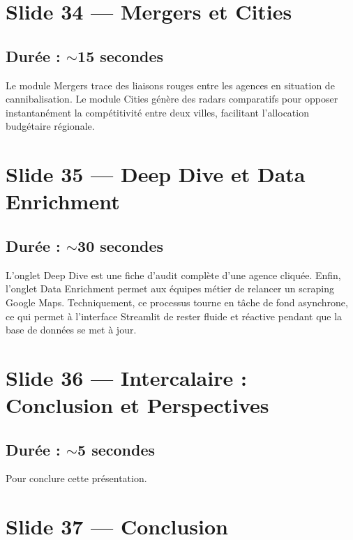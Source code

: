 \documentclass[11pt,a4paper]{article}
\begin{document}
\section{Slide 34 --- Mergers et Cities}
\subsection{Durée : $\sim$15 secondes}
Le module Mergers trace des liaisons rouges entre les agences en situation de cannibalisation. Le module Cities génère des radars comparatifs pour opposer instantanément la compétitivité entre deux villes, facilitant l'allocation budgétaire régionale.

\section{Slide 35 --- Deep Dive et Data Enrichment}
\subsection{Durée : $\sim$30 secondes}
L'onglet Deep Dive est une fiche d'audit complète d'une agence cliquée. Enfin, l'onglet Data Enrichment permet aux équipes métier de relancer un scraping Google Maps. Techniquement, ce processus tourne en tâche de fond asynchrone, ce qui permet à l'interface Streamlit de rester fluide et réactive pendant que la base de données se met à jour.

\section{Slide 36 --- Intercalaire : Conclusion et Perspectives}
\subsection{Durée : $\sim$5 secondes}
Pour conclure cette présentation.

\section{Slide 37 --- Conclusion}
\end{document}
